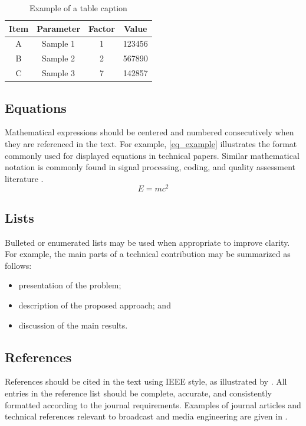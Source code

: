 \documentclass[journal]{IEEEtran}
\begin{document}
\begin{table}[!b]
\caption{Example of a table caption}
\label{tab_example}
\centering
\begin{tabular}{cccc}
\hline
Item & Parameter & Factor & Value \\
\hline
A & Sample 1 & 1 & 123456 \\
B & Sample 2 & 2 & 567890 \\
C & Sample 3 & 7 & 142857 \\
\hline
\end{tabular}
\end{table}

\subsection{Equations}
Mathematical expressions should be centered and numbered consecutively when they are referenced in the text. For example, \eqref{eq_example} illustrates the format commonly used for displayed equations in technical papers. Similar mathematical notation is commonly found in signal processing, coding, and quality assessment literature \cite{ref:h264,ref:hevc,ref:ssim}.
\begin{equation}
E = mc^2
\label{eq_example}
\end{equation}

\subsection{Lists}
Bulleted or enumerated lists may be used when appropriate to improve clarity. For example, the main parts of a technical contribution may be summarized as follows:
\begin{itemize}
    \item presentation of the problem;
    \item description of the proposed approach; and
    \item discussion of the main results.
\end{itemize}



\subsection{References}
References should be cited in the text using IEEE style, as illustrated by \cite{ref:kopka,ref:lamport}. All entries in the reference list should be complete, accurate, and consistently formatted according to the journal requirements. Examples of journal articles and technical references relevant to broadcast and media engineering are given in \cite{ref:h264,ref:hevc,ref:ssim,ref:setijbe}.
\end{document}
